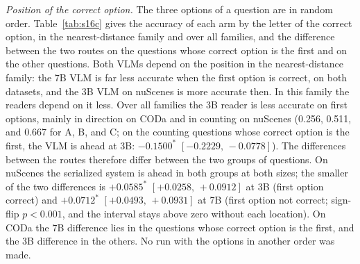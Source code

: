 \documentclass[10pt]{article}
\begin{document}
\emph{Position of the correct option.} The three options of a question are in random order. Table~\ref{tab:s16c} gives the accuracy of each arm by the letter of the correct option, in the nearest-distance family and over all families, and the difference between the two routes on the questions whose correct option is the first and on the other questions. Both VLMs depend on the position in the nearest-distance family: the 7B VLM is far less accurate when the first option is correct, on both datasets, and the 3B VLM on nuScenes is more accurate then. In this family the readers depend on it less. Over all families the 3B reader is less accurate on first options, mainly in direction on CODa and in counting on nuScenes (0.256, 0.511, and 0.667 for A, B, and C; on the counting questions whose correct option is the first, the VLM is ahead at 3B: $-0.1500^{*}$ $[-0.2229,\,-0.0778]$). The differences between the routes therefore differ between the two groups of questions. On nuScenes the serialized system is ahead in both groups at both sizes; the smaller of the two differences is $+0.0585^{*}$ $[+0.0258,\,+0.0912]$ at 3B (first option correct) and $+0.0712^{*}$ $[+0.0493,\,+0.0931]$ at 7B (first option not correct; sign-flip $p<0.001$, and the interval stays above zero without each location). On CODa the 7B difference lies in the questions whose correct option is the first, and the 3B difference in the others. No run with the options in another order was made.
\end{document}
